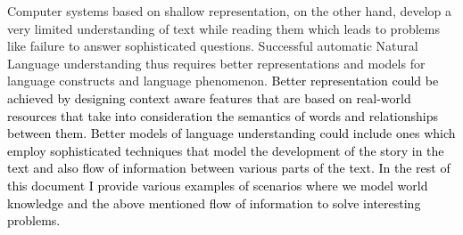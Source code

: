 \documentclass[9.8pt, twocolumn]{article}
\begin{document}
Computer systems based on shallow representation, on the other hand, develop a very limited understanding of text while reading them which leads to problems like failure to answer sophisticated questions. Successful automatic Natural Language understanding thus requires better representations and models for language constructs and language phenomenon. \textcolor{black}{Better representation could be achieved by designing context aware features that are based on real-world resources that take into consideration the semantics of words and relationships between them. Better models of language understanding could include ones which employ sophisticated techniques that model the development of the story in the text and also flow of information between various parts of the text. In the rest of this document I provide various examples of scenarios where we model world knowledge and the above mentioned flow of information to solve interesting problems.}



%
\end{document}
